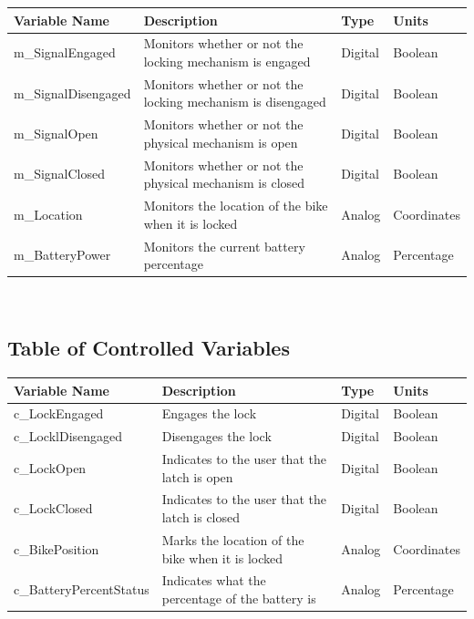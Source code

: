 \documentclass[12pt]{article}
\begin{document}
\begin{minipage}{\textwidth}
\renewcommand*{\arraystretch}{1.5}
\begin{tabular}{| p{} | p{} | p{} | p{} |}
 \hline
 Variable Name & Description & Type & Units \\ 
 \hline
 m\_SignalEngaged & Monitors whether or not the locking mechanism is engaged & Digital & Boolean \\ 
  \hline
 m\_SignalDisengaged & Monitors whether or not the locking mechanism is disengaged & Digital & Boolean \\ 
  \hline
 m\_SignalOpen & Monitors whether or not the physical mechanism is open & Digital & Boolean \\ 
  \hline
 m\_SignalClosed& Monitors whether or not the physical mechanism is closed & Digital & Boolean \\ 
  \hline
 m\_Location & Monitors the location of the bike when it is locked & Analog & Coordinates \\ 
  \hline
 m\_BatteryPower & Monitors the current battery percentage & Analog & Percentage \\ 
 \hline
\end{tabular}
\end{minipage}\\

\subsection{Table of Controlled Variables}

\begin{minipage}{\textwidth}
\renewcommand*{\arraystretch}{1.5}
\begin{tabular}{| p{} | p{} | p{} | p{} |}
 \hline
 Variable Name & Description & Type & Units \\ 
 \hline
 c\_LockEngaged & Engages the lock & Digital & Boolean \\ 
  \hline
 c\_LocklDisengaged & Disengages the lock & Digital & Boolean \\ 
  \hline
 c\_LockOpen & Indicates to the user that the latch is open & Digital & Boolean \\ 
  \hline
 c\_LockClosed& Indicates to the user that the latch is closed & Digital & Boolean \\ 
  \hline
 c\_BikePosition & Marks the location of the bike when it is locked & Analog & Coordinates \\ 
  \hline
 c\_BatteryPercentStatus & Indicates what the percentage of the battery is & Analog & Percentage \\ 
 \hline
\end{tabular}
\end{minipage}\\
~\newline
\end{document}
